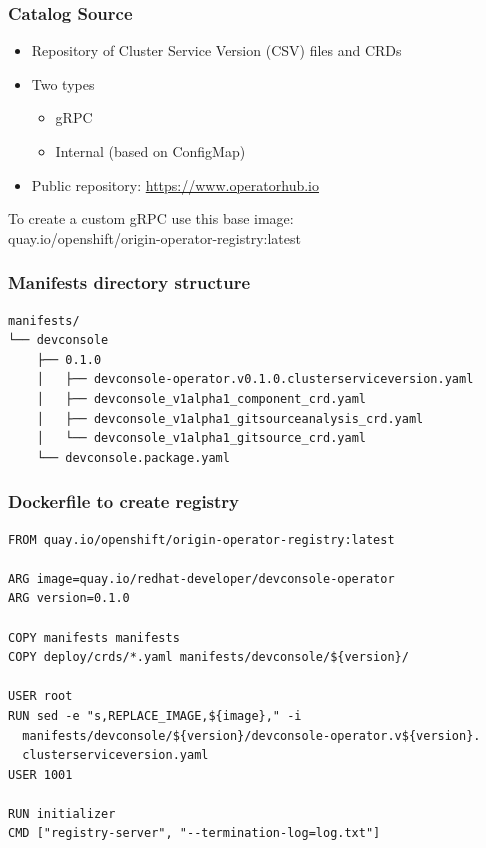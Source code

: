 \documentclass[aspectratio=169]{beamer}
\begin{document}
\begin{frame}

  \frametitle{Catalog Source}

  \begin{itemize}
  \item Repository of Cluster Service Version (CSV) files and CRDs
  \item Two types
    \begin{itemize}
    \item gRPC
    \item Internal (based on ConfigMap)
    \end{itemize}
  \item Public repository: \url{https://www.operatorhub.io}
  \end{itemize}

  To create a custom gRPC use this base image:\\
  quay.io/openshift/origin-operator-registry:latest

\end{frame}

\begin{frame}[fragile]
  \frametitle{Manifests directory structure}

  \begin{Verbatim}[fontsize=\small]
manifests/
└── devconsole
    ├── 0.1.0
    │   ├── devconsole-operator.v0.1.0.clusterserviceversion.yaml
    │   ├── devconsole_v1alpha1_component_crd.yaml
    │   ├── devconsole_v1alpha1_gitsourceanalysis_crd.yaml
    │   └── devconsole_v1alpha1_gitsource_crd.yaml
    └── devconsole.package.yaml
  \end{Verbatim}
  
\end{frame}

\begin{frame}[fragile]
  \frametitle{Dockerfile to create registry}

  \begin{Verbatim}[fontsize=\small]
FROM quay.io/openshift/origin-operator-registry:latest

ARG image=quay.io/redhat-developer/devconsole-operator
ARG version=0.1.0

COPY manifests manifests
COPY deploy/crds/*.yaml manifests/devconsole/${version}/

USER root
RUN sed -e "s,REPLACE_IMAGE,${image}," -i
  manifests/devconsole/${version}/devconsole-operator.v${version}.
  clusterserviceversion.yaml
USER 1001

RUN initializer
CMD ["registry-server", "--termination-log=log.txt"]
  \end{Verbatim}
  
\end{frame}
\end{document}
